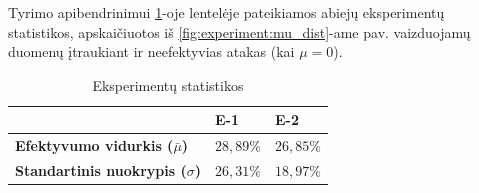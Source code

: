 Tyrimo apibendrinimui \ref{tab:experiment:stats}-oje lentelėje pateikiamos
abiejų eksperimentų statistikos, apskaičiuotos iš
\ref{fig:experiment:mu_dist}-ame pav. vaizduojamų duomenų įtraukiant ir
neefektyvias atakas (kai $\mu = 0$).

\begin{table}[h]
    \centering
    \begin{tabular}{l|l|l}
                                                   & \textbf{E-1} & \textbf{E-2} \\
        \midrule
        \textbf{Efektyvumo vidurkis ($\bar{\mu}$)} & $28,89 \%$   & $26,85 \%$   \\
        \textbf{Standartinis nuokrypis ($\sigma$)} & $26,31 \%$   & $18,97 \%$   \\
    \end{tabular}
    \caption{Eksperimentų statistikos}\label{tab:experiment:stats}
\end{table}
